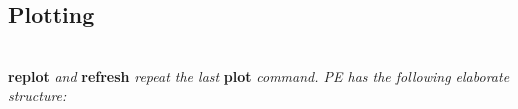 \begin{comment}
\textit{Command line options include:}\
\begin{itemize}[label=-]
    \item V \quad \ul{version}
    \item h \quad \ul{help}
    \item p \quad \ul{persist} plot windows after close 
    \item d \quad \ul{default-settings}
    \item s \quad \ul{slow}: wait for font initialization
    \item e \quad execute given command
    \item c \quad call given following script
\end{itemize}
\end{comment}



\subsection*{Plotting} 
\\[2mm]
\textbf{replot} \textit{ and }\textbf{refresh}\textit{ repeat the last }\textbf{plot}\textit{ command. PE has the following elaborate structure:}

